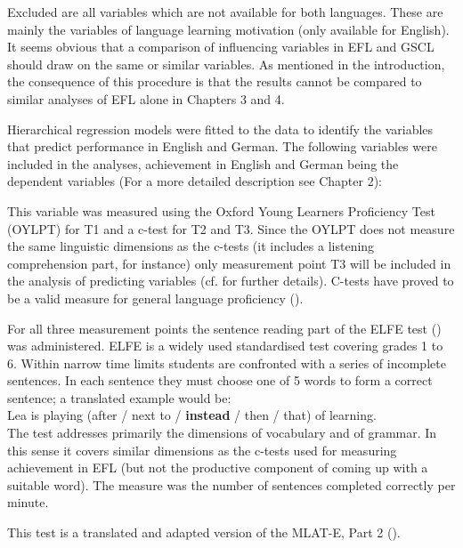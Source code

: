 \documentclass[output=paper]{langsci/langscibook}
\begin{document}
Excluded are all variables which are not available for both languages. These are mainly the variables of language learning motivation (only available for English). It seems obvious that a comparison of influencing variables in EFL and GSCL should draw on the same or similar variables. As mentioned in the introduction, the consequence of this procedure is that the results cannot be compared to similar analyses of EFL alone in Chapters 3 and 4.

Hierarchical regression models were fitted to the data to identify the variables that predict performance in English and German. The following variables were included in the analyses, achievement in English and German being the dependent variables (For a more detailed description see Chapter 2):

\begin{description}\sloppy
\item[Achievement in English as a foreign language (EFL):]
This variable was measured using the Oxford Young Learners Proficiency Test (OYLPT) for T1 and a c-test for T2 and T3. Since the OYLPT does not measure the same linguistic dimensions as the c-tests (it includes a listening comprehension part, for instance) only measurement point T3 will be included in the analysis of predicting variables (cf.  for further details). C-tests have proved to be a valid measure for general language proficiency (\citealt{EckesGrotjahn2006}).
\item[Achievement in German as the school language (GSCL):]
For all three measurement points the sentence reading part of the ELFE test (\citealt{LenhardSchneider2006}) was administered. ELFE is a widely used standardised test covering grades 1 to 6. Within narrow time limits students are confronted with a series of incomplete sentences. In each sentence they must choose one of 5 words to form a correct sentence; a translated example would be:\\
Lea is playing (after / next to / \textbf{instead} / then / that) of learning. \\
The test addresses primarily the dimensions of vocabulary and of grammar. In this sense it covers similar dimensions as the c-tests used for measuring achievement in EFL (but not the productive component of coming up with a suitable word). The measure was the number of sentences completed correctly per minute.
\item[Grammatical sensitivity (MLAT, Part 2):]
This test is a translated and adapted version of the MLAT-E, Part 2 (\citealt{CarrollSapon2010}). 

\end{description}
\end{document}
